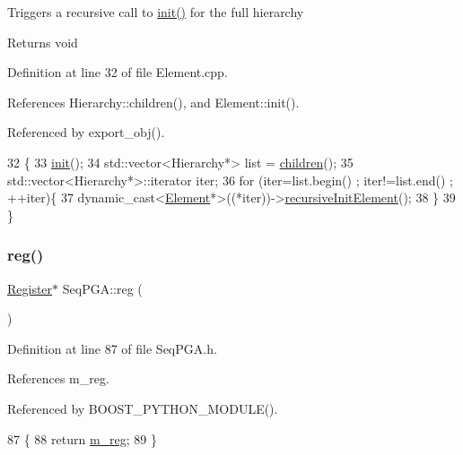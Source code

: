 Triggers a recursive call to \hyperlink{classSeqPGA_aba1ead90de9e6f14042d8838db5ebe5b}{init()} for the full hierarchy

\begin{DoxyReturn}{Returns}
void 
\end{DoxyReturn}


Definition at line 32 of file Element.\+cpp.



References Hierarchy\+::children(), and Element\+::init().



Referenced by export\+\_\+obj().


\begin{DoxyCode}
32                                   \{
33   \hyperlink{classElement_af42754b5cabc198869222725218d695c}{init}();
34   std::vector<Hierarchy*> list = \hyperlink{classHierarchy_aa9a76f69e98e052ee1a6e32cea006288}{children}();
35   std::vector<Hierarchy*>::iterator iter;
36   \textcolor{keywordflow}{for} (iter=list.begin() ; iter!=list.end() ; ++iter)\{
37     \textcolor{keyword}{dynamic\_cast<}\hyperlink{classElement}{Element}*\textcolor{keyword}{>}((*iter))->\hyperlink{classElement_a3c0abcb36f8906688bb7e32608df7086}{recursiveInitElement}();
38   \}
39 \}
\end{DoxyCode}
\mbox{\label{classSeqPGA_a43c48f29313ca63046cc8efc6cc73e23}} 
\subsubsection{\texorpdfstring{reg()}{reg()}}
{\footnotesize\ttfamily \hyperlink{classRegister}{Register}$\ast$ Seq\+P\+G\+A\+::reg (\begin{DoxyParamCaption}{ }\end{DoxyParamCaption})\hspace{0.3cm}{\ttfamily [inline]}}



Definition at line 87 of file Seq\+P\+G\+A.\+h.



References m\+\_\+reg.



Referenced by B\+O\+O\+S\+T\+\_\+\+P\+Y\+T\+H\+O\+N\+\_\+\+M\+O\+D\+U\+L\+E().


\begin{DoxyCode}
87                  \{
88     \textcolor{keywordflow}{return} \hyperlink{classSeqPGA_afd827f1d3d55b0a8efafbd79a8c54a52}{m\_reg};
89   \}
\end{DoxyCode}
\mbox{\label{classAttrib_a7d4ef7e32d93cb287792b87b857e79f3}} 
